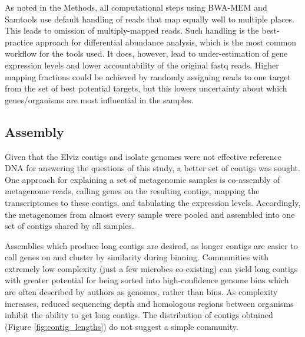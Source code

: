 As noted in the Methods, all computational steps using BWA-MEM and Samtools use default handling of reads that map equally well to multiple places.
This leads to omission of multiply-mapped reads.
Such handling is the best-practice approach for differential abundance analysis, which is the most common workflow for the tools used.
It does, however, lead to under-estimation of gene expression levels and lower accountability of the original fastq reads. %
Higher mapping fractions could be achieved by randomly assigning reads to one target from the set of best potential targets, but this lowers uncertainty about which genes/organisms are most influential in the samples.


\subsection{Assembly}

Given that the Elviz contigs and isolate genomes were not effective reference DNA for answering the questions of this study, a better set of contigs was sought.
One approach for explaining a set of metagenomic samples is co-assembly of metagenome reads, calling genes on the resulting contigs, mapping the transcriptomes to these contigs, and tabulating the expression levels.
Accordingly, the metagenomes from almost every sample were pooled and assembled into one set of contigs shared by all samples.

Assemblies which produce long contigs are desired, as longer contigs are easier to call genes on and cluster by similarity during binning.
Communities with extremely low complexity (just a few microbes co-existing) can yield long contigs with greater potential for being sorted into high-confidence genome bins which are often described by authors as genomes, rather than bins.
As complexity increases, reduced sequencing depth and homologous regions between organisms inhibit the ability to get long contigs.
The distribution of contigs obtained (Figure \ref{fig:contig_lengths}) do not suggest a simple community.


